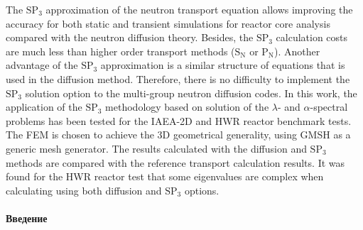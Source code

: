 \documentclass{crm-article}
\begin{document}
\begin{abstracteng}
The $\mathrm{SP_3}$ approximation of the neutron transport equation allows improving the accuracy for both static and transient simulations for reactor core analysis compared with the neutron diffusion theory. 
Besides, the $\mathrm{SP_3}$ calculation costs are much less than higher order transport methods ($\mathrm{S_N}$ or $\mathrm{P_N}$). 
Another advantage of the $\mathrm{SP_3}$ approximation is a similar structure of equations that is used in the diffusion method. 
Therefore, there is no difficulty to implement the $\mathrm{SP_3}$ solution option to the multi-group neutron diffusion codes. 
In this work, the application of the $\mathrm{SP_3}$ methodology based on solution of the $\lambda$- and $\alpha$-spectral problems has been tested for the IAEA-2D and HWR reactor benchmark tests. 
The FEM is chosen to achieve the 3D geometrical generality, using GMSH as a generic mesh generator. 
The results calculated with the diffusion and $\mathrm{SP_3}$ methods are compared with the reference transport calculation results. 
It was found for the HWR reactor test that some eigenvalues are complex when calculating using both diffusion and $\mathrm{SP_3}$ options.
\end{abstracteng}

\maketitle

\paragraph{Введение}
\end{document}

